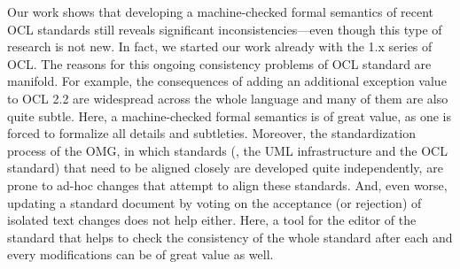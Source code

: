 Our work shows that developing a machine-checked formal semantics of
recent {OCL} standards still reveals significant
inconsistencies---even though this type of research is not new. In
fact, we started our work already with the 1.x series of
{OCL}. The reasons for this ongoing consistency problems of
{OCL} standard are manifold. For example, the consequences of
adding an additional exception value to OCL 2.2 are widespread across
the whole language and many of them are also quite subtle. Here, a
machine-checked formal semantics is of great value, as one is forced
to formalize all details and subtleties.  Moreover, the
standardization process of the {OMG}, in which standards (\eg, the
{UML} infrastructure and the {OCL} standard) that need to be
aligned closely are developed quite independently, are prone to ad-hoc
changes that attempt to align these standards. And, even worse,
updating a standard document by voting on the acceptance (or
rejection) of isolated text changes does not help either. Here, a tool
for the editor of the standard that helps to check the consistency of
the whole standard after each and every modifications can be of great
value as well.



